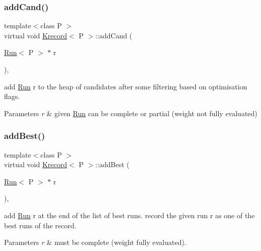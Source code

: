 \subsubsection{\texorpdfstring{addCand()}{addCand()}}
{\footnotesize\ttfamily template$<$class P $>$ \\
virtual void \mbox{\hyperlink{classKrecord}{Krecord}}$<$ P $>$\+::add\+Cand (\begin{DoxyParamCaption}\item[{\mbox{\hyperlink{classRun}{Run}}$<$ P $>$ $\ast$}]{r }\end{DoxyParamCaption})\hspace{0.3cm}{\ttfamily [protected]}, {\ttfamily [virtual]}}



add \mbox{\hyperlink{classRun}{Run}} r to the heap of candidates after some filtering based on optimisation flags. 


\begin{DoxyParams}{Parameters}
{\em r} & given \mbox{\hyperlink{classRun}{Run}} can be complete or partial (weight not fully evaluated) \\
\hline
\end{DoxyParams}
\mbox{\label{classKrecord_a101fe075076b9aecb97014a04e023c26}} 
\subsubsection{\texorpdfstring{addBest()}{addBest()}}
{\footnotesize\ttfamily template$<$class P $>$ \\
virtual void \mbox{\hyperlink{classKrecord}{Krecord}}$<$ P $>$\+::add\+Best (\begin{DoxyParamCaption}\item[{\mbox{\hyperlink{classRun}{Run}}$<$ P $>$ $\ast$}]{r }\end{DoxyParamCaption})\hspace{0.3cm}{\ttfamily [protected]}, {\ttfamily [virtual]}}



add \mbox{\hyperlink{classRun}{Run}} r at the end of the list of best runs. record the given run r as one of the best runs of the record. 


\begin{DoxyParams}{Parameters}
{\em r} & must be complete (weight fully evaluated). \\
\hline
\end{DoxyParams}
\mbox{\label{classKrecord_a1cee958825882ef5c782382770688bbe}} 
